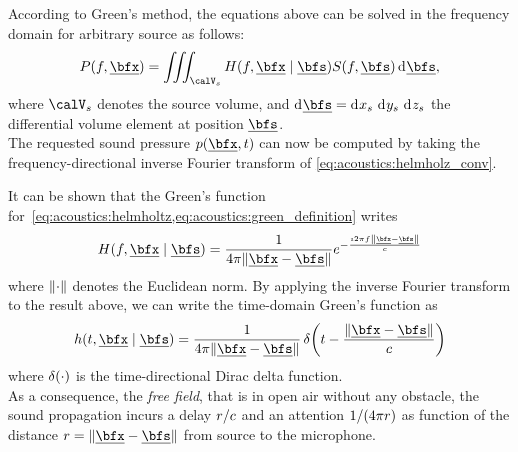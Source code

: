 According to Green's method, the equations above can be solved in the frequency domain for arbitrary source as follows:
\begin{equation}
    \label{eq:acoustics:helmholz_conv}
    P(f, \positionMicrophone) = \iiint_{\volume_\contSource} H(f, \positionMicrophone \mid \positionSource) S(f, \positionSource) \kdiff\positionSource
    ,
\end{equation}
where $\volume_\contSource$ denotes the source volume,
and  $\kdiff\positionSource =  \kdiff{x_\contSource}\,\kdiff{y_\contSource}\,\kdiff{z_\contSource}$ the  differential  volume element at position $\positionSource$.
\\The requested sound pressure $\pressureSpaceTime$ can now be computed by taking the frequency-directional inverse Fourier transform of \cref{eq:acoustics:helmholz_conv}.

It can be shown  that the Green's function for~\cref{eq:acoustics:helmholtz,eq:acoustics:green_definition} writes
\begin{equation}
    \label{eq:acoustics:greenFreeFreq}
    H(f, \positionMicrophone \mid \positionSource) = \frac{1}{4 \pi \norm{\positionMicrophone - \positionSource}} e^{- \frac{\Ii 2 \pi f \norm{\positionMicrophone - \positionSource}}{\speedOfSound}}
\end{equation}
where $\norm{\cdot}$ denotes the Euclidean norm.
By applying the inverse Fourier transform to the result above, we can write the time-domain Green's function as
\begin{equation}
    \label{eq:acoustics:greenFreeTime}
    h(t, \positionMicrophone \mid \positionSource) =
        \frac{1}{4 \pi \norm{\positionMicrophone - \positionSource}}
        \diracOf{t - \frac{\norm{\positionMicrophone - \positionSource}}{\speedOfSound}}
\end{equation}
where $\diracOf{\cdot}$ is the time-directional Dirac delta function.
\\As a consequence, the \textit{free field}, that is in open air without any obstacle, the  sound propagation
incurs a delay $r / c$
and an attention $1 / (4 \pi r)$ as function of the distance
$ \distMicSrc = \norm{\positionMicrophone - \positionSource}$ from source to the microphone.

